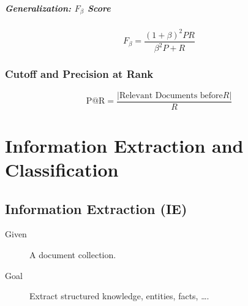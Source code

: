 \documentclass[a4paper, 11pt, accentcolor = tud3b]{tudreport}
\providecommand{\abs}[1]{\ensuremath{{\lvert #1 \rvert}}}
\begin{document}
                \paragraph{Generalization: \( F _ \beta \) Score}
                	\begin{equation*}
	                	F _ \beta = \frac{(1 + \beta)^2 P R}{\beta^2 P + R}
                	\end{equation*}

            \subsection{Cutoff and Precision at Rank} %
                \begin{equation*}
	                \text{P@R} = \frac{\abs{\text{Relevant Documents before} R}}{R} \tag{Precision at Rank}
                \end{equation*}

    \chapter{Information Extraction and Classification} %
        \section{Information Extraction (IE)} %
            \begin{description}
            	\item[Given] A document collection.
            	\item[Goal] Extract structured knowledge, entities, facts, \dots.
            \end{description}
\end{document}
